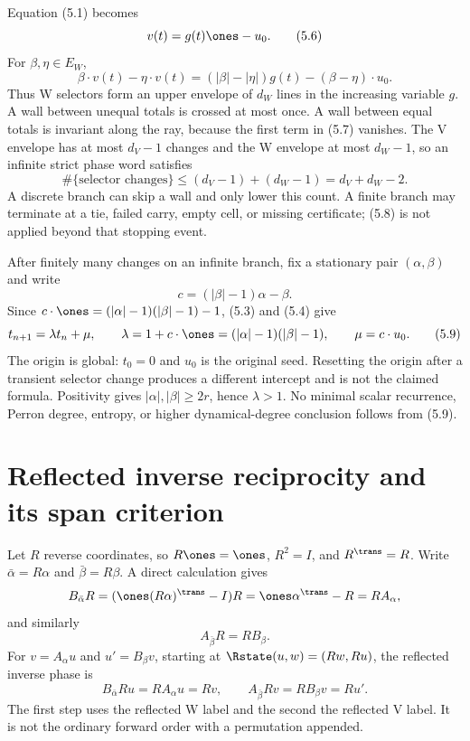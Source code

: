 \documentclass[11pt]{article}
\theoremstyle{definition}
\theoremstyle{remark}
\begin{document}
Equation (5.1) becomes
\[
 v(t)=g(t)\ones-u_0.
\tag{5.6}
\]
For $\beta,\eta\in E_W$,
\[
 \beta\cdot v(t)-\eta\cdot v(t)
 =(|\beta|-|\eta|)g(t)-(\beta-\eta)\cdot u_0.
\tag{5.7}
\]
Thus W selectors form an upper envelope of $d_W$ lines in the increasing
variable $g$.  A wall between unequal totals is crossed at most once.  A
wall between equal totals is invariant along the ray, because the first
term in (5.7) vanishes.  The V envelope has at most $d_V-1$ changes and
the W envelope at most $d_W-1$, so an infinite strict phase word satisfies
\[
 \#\{\text{selector changes}\}\leq(d_V-1)+(d_W-1)
 =d_V+d_W-2.
\tag{5.8}
\]
A discrete branch can skip a wall and only lower this count.  A finite branch
may terminate at a tie, failed carry, empty cell, or missing certificate;
(5.8) is not applied beyond that stopping event.

After finitely many changes on an infinite branch, fix a stationary pair
$(\alpha,\beta)$ and write
\[
 c=(|\beta|-1)\alpha-\beta.
\]
Since $c\cdot\ones=(|\alpha|-1)(|\beta|-1)-1$, (5.3) and (5.4) give
\[
 t_{n+1}=\lambda t_n+\mu,\qquad
 \lambda=1+c\cdot\ones=(|\alpha|-1)(|\beta|-1),\qquad
 \mu=c\cdot u_0.
\tag{5.9}
\]
The origin is global: $t_0=0$ and $u_0$ is the original seed.  Resetting the
origin after a transient selector change produces a different intercept
and is not the claimed formula.  Positivity gives $|\alpha|,|\beta|\geq
2r$, hence $\lambda>1$.  No minimal scalar recurrence, Perron degree,
entropy, or higher dynamical-degree conclusion follows from (5.9).

\begin{center}
\end{center}

\section{Reflected inverse reciprocity and its span criterion}

Let $R$ reverse coordinates, so $R\ones=\ones$, $R^2=I$, and
$R^{\trans}=R$.  Write $\bar\alpha=R\alpha$ and $\bar\beta=R\beta$.  A
direct calculation gives
\[
 B_{\bar\alpha}R
 =(\ones(R\alpha)^{\trans}-I)R
 =\ones\alpha^{\trans}-R
 =RA_\alpha,
\]
and similarly
\[
 A_{\bar\beta}R=RB_\beta.
\tag{6.1}
\]
For $v=A_\alpha u$ and $u'=B_\beta v$, starting at
$\Rstate(u,w)=(Rw,Ru)$, the reflected inverse phase is
\[
 B_{\bar\alpha}Ru=RA_\alpha u=Rv,\qquad
 A_{\bar\beta}Rv=RB_\beta v=Ru'.
\tag{6.2}
\]
The first step uses the reflected W label and the second the reflected V
label.  It is not the ordinary forward order with a permutation appended.
\end{document}
